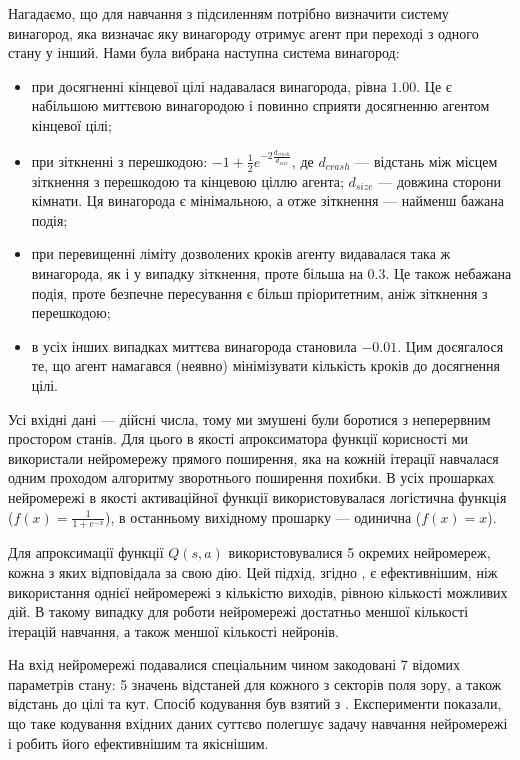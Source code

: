 \documentclass[a4paper,10pt,fleqn]{article}
\begin{document}
Нагадаємо, що для навчання з підсиленням потрібно визначити систему винагород, яка визначає яку винагороду отримує агент при переході з одного стану у інший. Нами була вибрана наступна система винагород:
\begin{itemize}
	\item при досягненні кінцевої цілі надавалася винагорода, рівна $1.00$. Це є набільшою миттєвою винагородою і повинно сприяти досягненню агентом кінцевої цілі;
	\item при зіткненні з перешкодою: $-1 + \frac{1}{2} e^{-2\frac{d_{crash}}{d_{size}}}$, де $d_{crash}$ --- відстань між місцем зіткнення з перешкодою та кінцевою ціллю агента; $d_{size}$ --- довжина сторони кімнати. Ця винагорода є мінімальною, а отже зіткнення --- найменш бажана подія;
	\item при перевищенні ліміту дозволених кроків агенту видавалася така ж винагорода, як і у випадку зіткнення, проте більша на $0.3$. Це також небажана подія, проте безпечне пересування є більш пріоритетним, аніж зіткнення з перешкодою;
	\item в усіх інших випадках миттєва винагорода становила $-0.01$. Цим досягалося те, що агент намагався (неявно) мінімізувати кількість кроків до досягнення цілі.
\end{itemize}

Усі вхідні дані --- дійсні числа, тому ми змушені були боротися з неперервним простором станів. Для цього в якості апроксиматора функції корисності ми використали нейромережу прямого поширення, яка на кожній ітерації навчалася одним проходом алгоритму зворотнього поширення похибки. В усіх прошарках нейромережі в якості активаційної функції використовувалася логістична функція ($f(x) = \frac{1}{1 + e^{-x}}$), в останньому вихідному прошарку --- одинична ($f(x) = x$).

Для апроксимації функції $Q(s,a)$ використовувалися 5 окремих нейромереж, кожна з яких відповідала за свою дію. Цей підхід, згідно \cite{Rummery1995}, є ефективнішим, ніж використання однієї нейромережі з кількістю виходів, рівною кількості можливих дій. В такому випадку для роботи нейромережі достатньо меншої кількості ітерацій навчання, а також меншої кількості нейронів.

На вхід нейромережі подавалися спеціальним чином закодовані 7 відомих параметрів стану: 5 значень відстаней для кожного з секторів поля зору, а також відстань до цілі та кут. Спосіб кодування був взятий з \cite{Rummery1995}. Експерименти показали, що таке кодування вхідних даних суттєво полегшує задачу навчання нейромережі і робить його ефективнішим та якіснішим.
\end{document}
